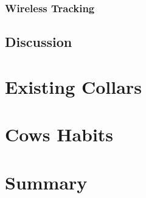 \subsubsection{Wireless Tracking}
\label{subsubsection:wireless_tracking}

\subsection{Discussion}


\section{Existing Collars}
\label{sec:existing_collars}

\section{Cows Habits}
\label{sec:cows}

\section{Summary}
\label{sec:summary}

